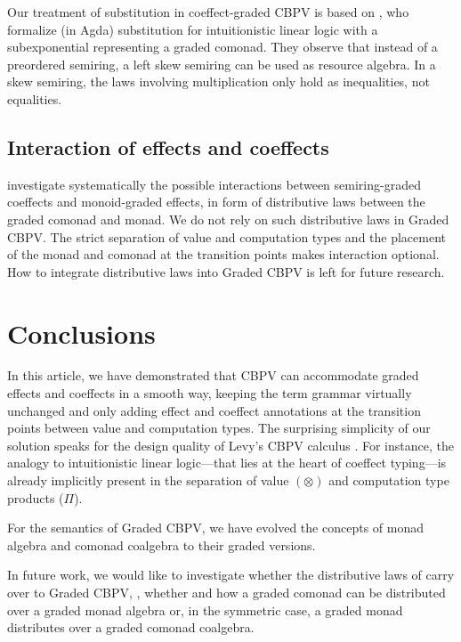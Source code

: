 \documentclass[acmsmall,review,anonymous]{acmart}\settopmatter{printfolios=true,printccs=false,printacmref=false}
\theoremstyle{remark}
\begin{document}
Our treatment of substitution in coeffect-graded CBPV is based on
\citet{woodAtkey:linearity20}, who formalize (in Agda) substitution
for intuitionistic linear logic with a subexponential representing a
graded comonad.  They observe that instead of a preordered semiring, a
left skew semiring can be used as resource algebra.  In a skew
semiring, the laws involving multiplication only hold as inequalities,
not equalities.

\subsection{Interaction of effects and coeffects}

\citet{orchard:icfp16} investigate systematically the possible
interactions between semiring-graded coeffects and monoid-graded
effects, in form of distributive laws between the graded comonad and
monad.  We do not rely on such distributive laws in Graded CBPV.  The
strict separation of value and computation types and the placement of
the monad and comonad at the transition points makes interaction
optional.  How to integrate distributive laws into Graded CBPV is left
for future research.



\section{Conclusions}

In this article, we have demonstrated that CBPV can accommodate graded
effects and coeffects in a smooth way, keeping the term grammar
virtually unchanged and only adding effect and coeffect annotations at
the transition points between value and computation types.  The
surprising simplicity of our solution speaks for the design quality of
Levy's CBPV calculus \cite{levy:hosc06}.  For instance, the analogy to
intuitionistic linear logic---that lies at the heart of coeffect
typing---is already implicitly present in the separation of value
$(\otimes)$ and computation type products ($\Pi$).

For the semantics of Graded CBPV, we have evolved the concepts of
monad algebra and comonad coalgebra to their graded versions.

In future work, we would like to investigate whether the distributive
laws of \citet{orchard:icfp16} carry over to Graded CBPV, \eg, whether
and how a graded comonad can be distributed over a graded monad
algebra or, in the symmetric case, a graded monad distributes over a
graded comonad coalgebra.
\end{document}
